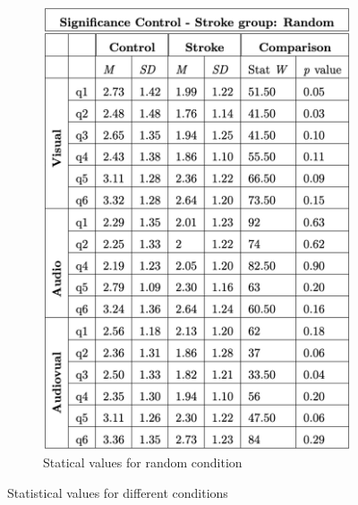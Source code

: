 \begin{figure}[htbp]
\begin{subfigure}[htbp]{0.45\textwidth}
        \includegraphics[width=\textwidth]{significance_tables/significance_random_pop.png}
        \caption{Statical values for random condition}
        \label{fig: significance_pop_random} 
    \end{subfigure} 
    \caption{Statistical values for different conditions}
    \label{fig: significance pop}
\end{figure}

